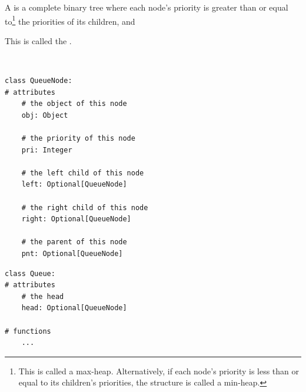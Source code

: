\documentclass[mathserif, handout]{beamer}
\begin{document}
\begin{frame}
\begin{thmbox}
A  is a complete binary tree where each node's priority is greater than or equal to\footnote{This is called a max-heap. Alternatively, if each node’s priority is less than or equal to its children’s priorities, the structure is called a min-heap.} the priorities of its children, and
\begin{center}
\end{center}
This is called the .    
\end{thmbox}

\end{frame}

\begin{frame}[fragile]
\begin{thmboxtop}
 \\
\begin{lstlisting}[style=mypython]
class QueueNode:
# attributes
    # the object of this node
    obj: Object

    # the priority of this node
    pri: Integer

    # the left child of this node
    left: Optional[QueueNode]

    # the right child of this node
    right: Optional[QueueNode]

    # the parent of this node
    pnt: Optional[QueueNode]
\end{lstlisting}
\end{thmboxtop}
\end{frame}

\begin{frame}[fragile]
\begin{thmboxbot}
\begin{lstlisting}[style=mypython]
class Queue:
# attributes
    # the head
    head: Optional[QueueNode]

# functions
    ...
\end{lstlisting}
\end{thmboxbot}
\end{frame}
\end{document}
